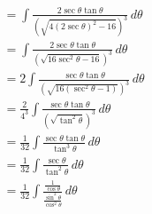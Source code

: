 \documentclass[preview]{standalone}
\begin{document}
\begin{align*}
&= \int \frac{2\sec\theta\tan\theta}{(\sqrt{4(2\sec\theta)^2-16})^3} \, d\theta \\ &=\int \frac{2\sec\theta\tan\theta}{(\sqrt{16\sec^2\theta-16})^3} \, d\theta \\ &=2\int \frac{\sec\theta\tan\theta}{(\sqrt{16(\sec^2\theta-1)})^3} \, d\theta \\ &=\frac{2}{4^3} \int \frac{\sec\theta\tan\theta}{(\sqrt{\tan^2\theta})^3} \, d\theta \\ &=\frac{1}{32} \int \frac{\sec\theta\tan\theta}{\tan^3\theta} \, d\theta \\ &=\frac{1}{32} \int \frac{\sec\theta}{\tan^2\theta }\, d\theta \\&=\frac{1}{32} \int \frac{\frac{1}{\cos\theta}}{\frac{\sin^2\theta}{\cos^2\theta}} \, d\theta
\end{align*}
\end{document}
